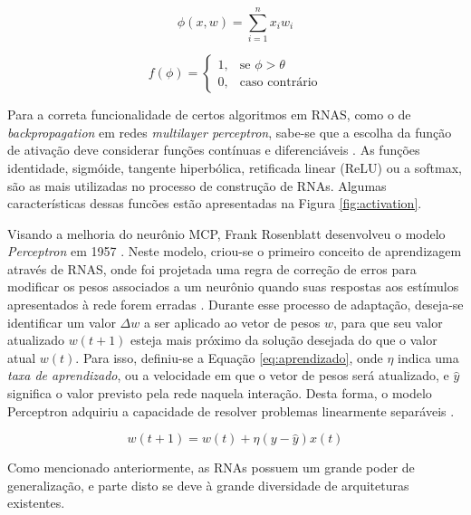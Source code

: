 \begin{equation}
  \label{eq:soma-ponderada}
  \phi(x,w) = \sum\limits_{i=1}^n x_i w_i
\end{equation}

\begin{equation}
\label{eq:degrau}
f(\phi) = \left\{
\begin{array}{lr}
  1, & \text{se } \phi > \theta\\
  0, & \text{caso contrário}
\end{array}
\right.
\end{equation}

Para a correta funcionalidade de certos algoritmos em RNAS, como o de \emph{backpropagation} em redes \emph{multilayer perceptron}, sabe-se que a escolha da função de ativação deve considerar funções contínuas e diferenciáveis \cite{haykin}. As funções identidade, sigmóide, tangente hiperbólica, retificada linear (ReLU) ou a softmax, são as mais utilizadas no processo de construção de RNAs. Algumas características dessas funcões estão apresentadas na Figura \ref{fig:activation}.


Visando a melhoria do neurônio MCP, Frank Rosenblatt desenvolveu o modelo \emph{Perceptron} em 1957 \cite{Rosenblatt}. Neste modelo, criou-se o primeiro conceito de aprendizagem através de RNAS, onde foi projetada uma regra de correção de erros para modificar os pesos associados a um neurônio quando suas respostas aos estímulos apresentados à rede forem erradas \cite{arbib}. Durante esse processo de adaptação, deseja-se identificar um valor $\Delta w$ a ser aplicado ao vetor de pesos $w$, para que seu valor atualizado $w(t+1)$ esteja mais próximo da solução desejada do que o valor atual $w(t)$. Para isso, definiu-se a Equação \ref{eq:aprendizado}, onde $\eta$ indica uma \emph{taxa de aprendizado}, ou a velocidade em que o vetor de pesos será atualizado, e $\hat{y}$ significa o valor previsto pela rede naquela interação. Desta forma, o modelo Perceptron adquiriu a capacidade de resolver problemas linearmente separáveis \cite{braga}.

\begin{equation}
  \label{eq:aprendizado}
  w(t+1) = w(t) + \eta (y - \hat{y}) x(t)
\end{equation}

Como mencionado anteriormente, as RNAs possuem um grande poder de generalização, e parte disto se deve à grande diversidade de arquiteturas existentes.

